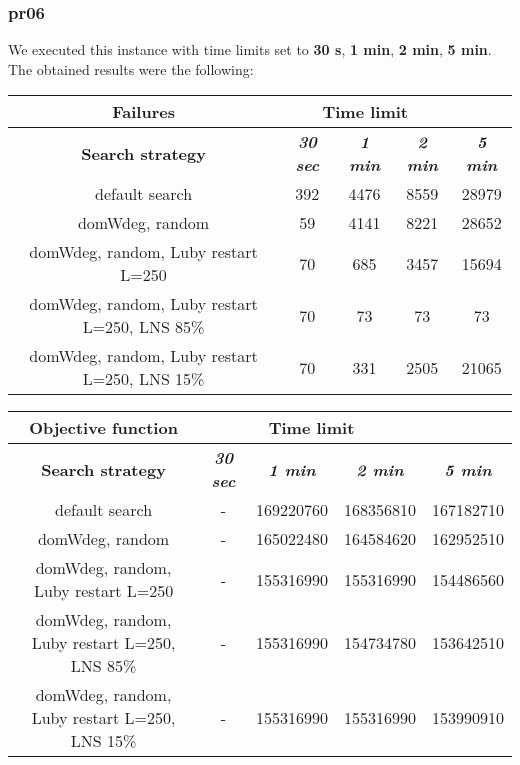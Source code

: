 \subsubsection{pr06}
We executed this instance with time limits set to \textbf{30 s}, \textbf{1 min}, \textbf{2 min}, \textbf{5 min}.\\
The obtained results were the following:
{
\renewcommand{\arraystretch}{2}
\begin{longtable}[h]{| c | c | c | c | c |}
    \hline
    \textbf{Failures} & \multicolumn{3}{c}{Time limit} & \\
    \hline
    \textbf{Search strategy} & \textbf{\textit{30 sec}} & \textbf{\textit{1 min}} & \textbf{\textit{2 min}} & \textbf{\textit{5 min}} \\
    \hline
    \endhead
    default search                                & 392 & 4476 & 8559 & 28979 \\
    \hline
    domWdeg, random                               &  59 & 4141 & 8221 & 28652 \\
    \hline
    domWdeg, random, Luby restart L=250           &  70 &  685 & 3457 & 15694 \\
    \hline
    domWdeg, random, Luby restart L=250, LNS 85\% &  70 &   73 &   73 &    73 \\
    \hline
    domWdeg, random, Luby restart L=250, LNS 15\% &  70 &  331 & 2505 &  21065 \\
    \hline
\end{longtable}
}

{
\renewcommand{\arraystretch}{2}
\begin{longtable}[h]{| c | c | c | c | c |}
    \hline
    \textbf{Objective function} & \multicolumn{3}{c}{Time limit} & \\
    \hline
    \textbf{Search strategy} & \textbf{\textit{30 sec}} & \textbf{\textit{1 min}} & \textbf{\textit{2 min}} & \textbf{\textit{5 min}} \\
    \hline
    \endhead
    default search                                & - & 169220760 & 168356810 & 167182710 \\
    \hline
    domWdeg, random                               & - & 165022480 & 164584620 & 162952510 \\
    \hline
    domWdeg, random, Luby restart L=250           & - & 155316990 & 155316990 & 154486560 \\
    \hline
    domWdeg, random, Luby restart L=250, LNS 85\% & - & 155316990 & 154734780 & 153642510 \\
    \hline
    domWdeg, random, Luby restart L=250, LNS 15\% & - & 155316990 & 155316990 & 153990910 \\
    \hline
\end{longtable}
}